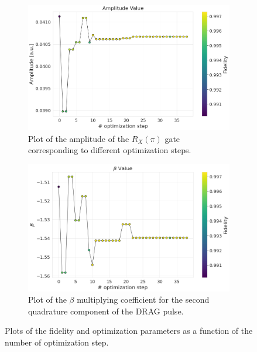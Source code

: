 \begin{figure}[h!]
    \begin{subfigure}[t]{0.495\textwidth}
        \includegraphics[width=\textwidth]{figures/png/RB_optimization/NM/post_ft_true/amplitude.png}
        \caption{Plot of the amplitude of the $R_X(\pi)$ gate corresponding to different optimization steps.}
        \label{NM_true_fig:amplitude}
    \end{subfigure}
    \hfill
    \begin{subfigure}[t]{0.495\textwidth}
        \includegraphics[width=\textwidth]{figures/png/RB_optimization/NM/post_ft_true/beta.png}
        \caption{Plot of the $\beta$ multiplying coefficient for the second quadrature component of the DRAG pulse.}
        \label{NM_true_fig:beta}
    \end{subfigure}

    \caption{Plots of the fidelity and optimization parameters as a function of the number of optimization step.}
    \label{fig:NM_plots}
\end{figure}

